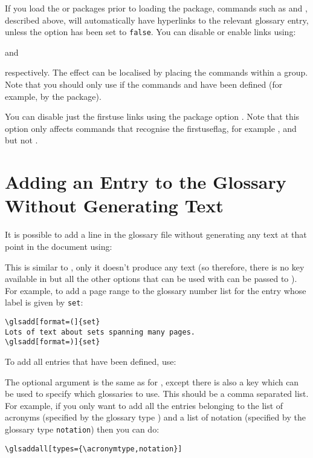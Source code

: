 \documentclass{nlctdoc}
\newcommand*{\firstuseflag}{\gls{firstuseflag}}
\newcommand*{\gloskey}[2][newglossaryentry]{\csopt{#1}{#2}}
\begin{document}
If you load the  or  packages prior to
loading the  package, commands such as 
and , described above, will automatically have hyperlinks
to the relevant glossary entry, unless the \gloskey[glslink]{hyper}
option has been set to \texttt{false}. You can disable or enable links using:
\begin{definition}[\DescribeMacro{\glsdisablehyper}]
\end{definition}
and
\begin{definition}[\DescribeMacro{\glsenablehyper}]
\end{definition}
respectively. The effect can be localised by placing the commands
within a group. Note that you should only use 
if the commands  and  have been
defined (for example, by the  package).

You can disable just the \gls{firstuse} links using the package
option . Note that this option only
affects commands that recognise the \firstuseflag, for example
,  and  but not .


\section{Adding an Entry to the Glossary Without Generating Text}
\label{sec:glsadd}

It is possible to add a line in the glossary file without
generating any text at that point in the document using:
\begin{definition}[\DescribeMacro{\glsadd}]
\end{definition}
This is similar to , only it doesn't produce
any text (so therefore, there is no \gloskey[glslink]{hyper} key
available in  but all the other options that can
be used with  can be passed to ).
For example, to add a page range to the glossary number list for the
entry whose label is given by \texttt{set}:
\begin{verbatim}
\glsadd[format=(]{set}
Lots of text about sets spanning many pages.
\glsadd[format=)]{set}
\end{verbatim}

To add all entries that have been defined, use:
\begin{definition}[\DescribeMacro{\glsaddall}]
\end{definition}
The optional argument is the same as for , except
there is also a key \gloskey[glsaddall]{types} which can be
used to specify which glossaries to use. This should be a
comma separated list. For example, if you only want to add
all the entries belonging to the list of acronyms (specified by
the glossary type ) and a list of
notation (specified by the glossary type \texttt{notation}) then you can
do:
\begin{verbatim}
\glsaddall[types={\acronymtype,notation}]
\end{verbatim}
\end{document}
